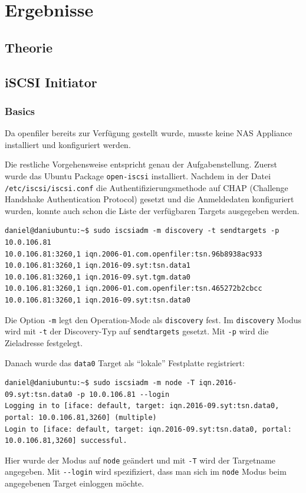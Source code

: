 
\section{Ergebnisse}
\subsection{Theorie}
\subsection{iSCSI Initiator}
\subsubsection{Basics}
Da openfiler bereits zur Verfügung gestellt wurde, musste keine NAS Appliance installiert und konfiguriert werden.

Die restliche Vorgehensweise entspricht genau der Aufgabenstellung. Zuerst wurde das Ubuntu Package \texttt{open-iscsi} installiert. Nachdem in der Datei \texttt{/etc/iscsi/iscsi.conf} die Authentifizierungsmethode auf CHAP (Challenge Handshake Authentication Protocol) gesetzt und die Anmeldedaten konfiguriert wurden, konnte auch schon die Liste der verfügbaren Targets ausgegeben werden.

\begin{lstlisting}[style=bash, caption=Verfügbare Targets]
daniel@daniubuntu:~$ sudo iscsiadm -m discovery -t sendtargets -p 10.0.106.81
10.0.106.81:3260,1 iqn.2006-01.com.openfiler:tsn.96b8938ac933
10.0.106.81:3260,1 iqn.2016-09.syt:tsn.data1
10.0.106.81:3260,1 iqn.2016-09.syt.tgm.data0
10.0.106.81:3260,1 iqn.2006-01.com.openfiler:tsn.465272b2cbcc
10.0.106.81:3260,1 iqn.2016-09.syt:tsn.data0
\end{lstlisting}
Die Option \texttt{-m} legt den Operation-Mode als \texttt{discovery} fest. Im \texttt{discovery} Modus wird mit \texttt{-t} der Discovery-Typ auf \texttt{sendtargets} gesetzt. Mit \texttt{-p} wird die Zieladresse festgelegt.

Danach wurde das \texttt{data0} Target als ``lokale'' Festplatte registriert:
\begin{lstlisting}[style=bash, caption=Target ``lokal'' registrieren]
daniel@daniubuntu:~$ sudo iscsiadm -m node -T iqn.2016-09.syt:tsn.data0 -p 10.0.106.81 --login
Logging in to [iface: default, target: iqn.2016-09.syt:tsn.data0, portal: 10.0.106.81,3260] (multiple)
Login to [iface: default, target: iqn.2016-09.syt:tsn.data0, portal: 10.0.106.81,3260] successful.
\end{lstlisting}
Hier wurde der Modus auf \texttt{node} geändert und mit \texttt{-T} wird der Targetname angegeben. Mit \texttt{-{}-login} wird spezifiziert, dass man sich im \texttt{node} Modus beim angegebenen Target einloggen möchte.

